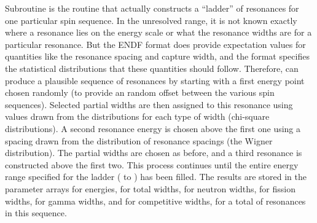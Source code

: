 Subroutine 
is the routine that actually constructs a
``ladder'' of resonances for one particular spin sequence.  In the
unresolved range, it is not known exactly where a resonance lies on
the energy scale or what the resonance widths are for a particular
resonance.  But the ENDF format does provide expectation values for
quantities like the resonance spacing and capture width, and the format
specifies the statistical distributions that these quantities should
follow.  Therefore,  can produce a plausible sequence of
resonances by starting with a first energy point chosen randomly (to
provide an random offset between the various spin sequences).  Selected
partial widths are then assigned to this resonance using values drawn
from the distributions for each type of width (chi-square
distributions).  A second resonance energy is chosen above the first
one using a spacing drawn from the distribution of resonance spacings
(the Wigner distribution).  The partial widths are chosen as before,
and a third resonance is constructed above the first two.  This process
continues until the entire energy range specified for the ladder
( to ) has been filled.  The results are stored
in the parameter arrays  for energies,  for total
widths,  for neutron widths,  for fission widths,
 for gamma widths, and  for competitive widths,
for a total of  resonances in this sequence.

